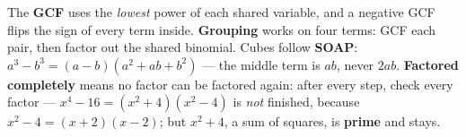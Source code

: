 \documentclass[12pt]{article}
\begin{document}
\vspace{0.14in}

\boxguard[8]
\begin{remindbox}
\small
The \textbf{GCF} uses the \emph{lowest} power of each shared variable, and a negative GCF flips
the sign of every term inside. \textbf{Grouping} works on four terms: GCF each pair, then factor
out the shared binomial. Cubes follow \textbf{SOAP}: $a^3-b^3=(a-b)(a^2+ab+b^2)$ --- the middle
term is $ab$, never $2ab$. \textbf{Factored completely} means no factor can be factored again:
after every step, check every factor --- $x^4-16=(x^2+4)(x^2-4)$ is \emph{not} finished, because
$x^2-4=(x+2)(x-2)$; but $x^2+4$, a sum of squares, is \textbf{prime} and stays.
\end{remindbox}
\end{document}
